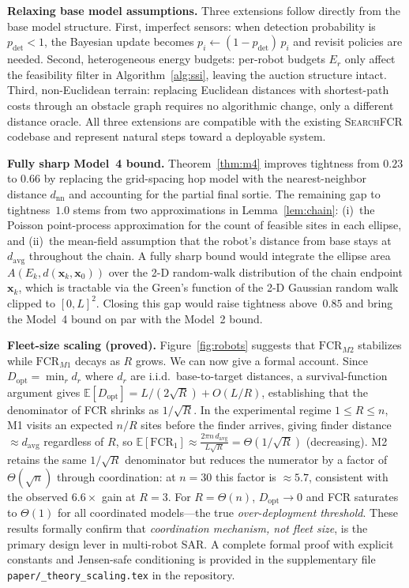 \documentclass[conference]{IEEEtran}
\begin{document}
\textbf{Relaxing base model assumptions.}
Three extensions follow directly from the base model structure.
First, imperfect sensors: when detection probability is $p_{\mathrm{det}} < 1$,
the Bayesian update becomes $p_i \leftarrow (1-p_{\mathrm{det}})\,p_i$ and
revisit policies are needed.
Second, heterogeneous energy budgets: per-robot budgets $E_r$ only affect
the feasibility filter in Algorithm~\ref{alg:ssi}, leaving the auction
structure intact.
Third, non-Euclidean terrain: replacing Euclidean distances with
shortest-path costs through an obstacle graph requires no algorithmic change,
only a different distance oracle.
All three extensions are compatible with the existing \textsc{SearchFCR}
codebase and represent natural steps toward a deployable system.

\textbf{Fully sharp Model~4 bound.}
Theorem~\ref{thm:m4} improves tightness from $0.23$ to $0.66$ by replacing
the grid-spacing hop model with the nearest-neighbor distance $d_{\mathrm{nn}}$
and accounting for the partial final sortie.
The remaining gap to tightness~$1.0$ stems from two approximations in
Lemma~\ref{lem:chain}: (i)~the Poisson point-process approximation for the
count of feasible sites in each ellipse, and (ii)~the mean-field assumption
that the robot's distance from base stays at $d_{\mathrm{avg}}$ throughout
the chain.
A fully sharp bound would integrate the ellipse area $A(E_k, d(\mathbf{x}_k,\mathbf{x}_0))$
over the 2-D random-walk distribution of the chain endpoint $\mathbf{x}_k$,
which is tractable via the Green's function of the 2-D Gaussian random walk
clipped to $[0,L]^2$.
Closing this gap would raise tightness above~$0.85$ and bring the Model~4
bound on par with the Model~2 bound.

\textbf{Fleet-size scaling (proved).}
Figure~\ref{fig:robots} suggests that $\mathrm{FCR}_{M2}$ stabilizes while
$\mathrm{FCR}_{M1}$ decays as $R$ grows.
We can now give a formal account.
Since $D_{\mathrm{opt}} = \min_{r} d_r$ where $d_r$ are i.i.d.\ base-to-target
distances, a survival-function argument gives
$\mathbb{E}[D_{\mathrm{opt}}] = L/(2\sqrt{R}) + O(L/R)$, establishing that
the denominator of FCR shrinks as $1/\sqrt{R}$.
In the experimental regime $1 \le R \le n$, M1 visits an expected $n/R$
sites before the finder arrives, giving finder distance $\approx d_{\mathrm{avg}}$
regardless of $R$, so
$\mathbb{E}[\mathrm{FCR}_1] \approx \frac{2\pi n\,d_{\mathrm{avg}}}{L\sqrt{R}}
= \Theta(1/\sqrt{R})$ (decreasing).
M2 retains the same $1/\sqrt{R}$ denominator but reduces the numerator by
a factor of $\Theta(\sqrt{n})$ through coordination: at $n{=}30$ this
factor is ${\approx}5.7$, consistent with the observed $6.6\times$ gain at
$R{=}3$.
For $R = \Theta(n)$, $D_{\mathrm{opt}} \to 0$ and FCR saturates to $\Theta(1)$
for all coordinated models---the true \emph{over-deployment threshold}.
These results formally confirm that \emph{coordination mechanism, not fleet
size}, is the primary design lever in multi-robot SAR.
A complete formal proof with explicit constants and Jensen-safe conditioning is provided in the supplementary file \texttt{paper/\_theory\_scaling.tex} in the repository.
\end{document}
